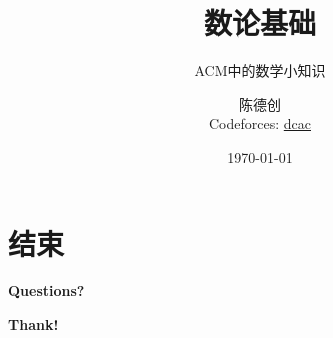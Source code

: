 \documentclass[9pt, c, compress]{beamer}	%
\title{数论基础}
\subtitle{ACM中的数学小知识}
\author[dcac]{陈德创 \\
Codeforces: \textcolor{purple}{\href{https://codeforces.com/profile/dcac}{dcac}}}
\date{\today}
\theoremstyle{plain}
\theoremstyle{definition}
\theoremstyle{remark}
\numberwithin{equation}{section}
\begin{document}
\begin{frame}
\insertlogo
\titlepage
\end{frame}


















\section{结束}
\begin{frame}
\begin{center} {\bfseries \Huge Questions?} \end{center}
\end{frame}

\begin{frame}
  \begin{center} {\bfseries \Huge Thank!} \end{center}
\end{frame}
\end{document}
